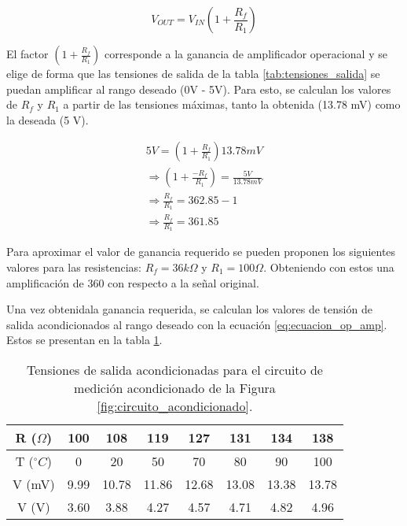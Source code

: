 \documentclass[journal,trans]{IEEEtran}
\begin{document}
\begin{equation}
    \label {eq:ecuacion_op_amp}
    V_{OUT} = V_{IN}(1+\frac{R_{f}}{R_{1}})
\end{equation}

El factor $(1+\frac{R_{f}}{R_{1}})$ corresponde a la ganancia de amplificador operacional y se elige de forma que las tensiones de salida de la tabla \ref{tab:tensiones_salida} se puedan amplificar al rango deseado (0V - 5V). Para esto, se calculan los valores de $R_{f}$ y $R_{1}$ a partir de las tensiones máximas, tanto la obtenida (13.78 mV) como la deseada (5 V).

\begin{gather*}
    5V = (1+\frac{R_{f}}{R_{1}})13.78mV \\
    \Longrightarrow (1+\frac{-R_{f}}{R_{1}}) = \frac{5 V}{13.78 mV} \\
    \Longrightarrow \frac{R_{f}}{R_{1}} = 362.85-1 \\
    \Longrightarrow \frac{R_{f}}{R_{1}} = 361.85
\end{gather*}

Para aproximar el valor de ganancia requerido se pueden proponen los siguientes valores para las resistencias: $R_{f}=36 k\Omega$ y $R_{1}=100 \Omega$. Obteniendo con estos una amplificación de 360 con respecto a la señal original.

Una vez obtenidala ganancia requerida, se calculan los valores de tensión de salida acondicionados al rango deseado con la ecuación \ref{eq:ecuacion_op_amp}. Estos se presentan en la tabla \ref{tab:tensiones_salida_acondicionados}.

\begin{table}[htb]
    \begin{center}
        \caption{Tensiones de salida acondicionadas para el circuito de medición acondicionado de la Figura \ref{fig:circuito_acondicionado}.}
        \label{tab:tensiones_salida_acondicionados}
        \begin{tabular}{c | c | c | c | c | c | c | c}
            \hline
            R ($\Omega$) & 100 & 108 & 119 & 127 & 131 & 134 & 138 \\
            \hline
            T ($^{\circ}C$) & 0 & 20 & 50 & 70 & 80 & 90 & 100 \\
            \hline
            V (mV) & 9.99 & 10.78 & 11.86 & 12.68 & 13.08 & 13.38 & 13.78 \\
            \hline
            V (V) & 3.60 & 3.88 & 4.27 & 4.57 & 4.71 & 4.82 & 4.96 \\
            \hline
        \end{tabular}
    \end{center}
\end{table}
\end{document}
